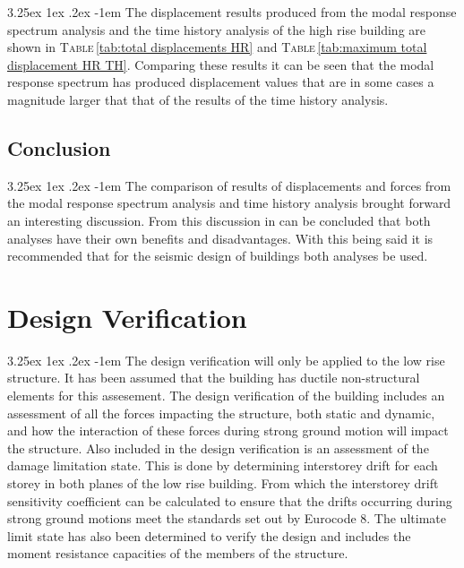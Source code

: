 \documentclass[11pt,a4paper,titlepage]{report}
\makeatletter
\renewcommand\paragraph{\@startsection{paragraph}{5}{\z@}%
  {3.25ex \@plus1ex \@minus.2ex}%
  {-1em}%
  {\normalfont\normalsize\bfseries}}
\makeatother
\begin{document}
\paragraph{}The displacement results produced from the modal response spectrum analysis and the time history analysis of the high rise building are shown in \textsc{Table}\,\ref{tab:total displacements HR} and \textsc{Table}\,\ref{tab:maximum total displacement HR TH}. Comparing these results it can be seen that the modal response spectrum has produced displacement values that are in some cases a magnitude larger that that of the results of the time history analysis. 
\section{Conclusion}
\paragraph{}The comparison of results of displacements and forces from the modal response spectrum analysis and time history analysis brought forward an interesting discussion. From this discussion in can be concluded that both analyses have their own benefits and disadvantages. With this being said it is recommended that for the seismic design of buildings both analyses be used.  
\chapter{Design Verification}
\paragraph{}The design verification will only be applied to the low rise structure. It has been assumed that the building has ductile non-structural elements for this assesement. The design verification of the building includes an assessment of all the forces impacting the structure, both static and dynamic, and how the interaction of these forces during strong ground motion will impact the structure. Also included in the design verification is an assessment of the damage limitation state. This is done by determining interstorey drift for each storey in both planes of the low rise building. From which the interstorey drift sensitivity coefficient can be calculated to ensure that the drifts occurring during strong ground motions meet the standards set out by Eurocode 8. The ultimate limit state has also been determined to verify the design and includes the moment resistance capacities of the members of the structure.
\end{document}
